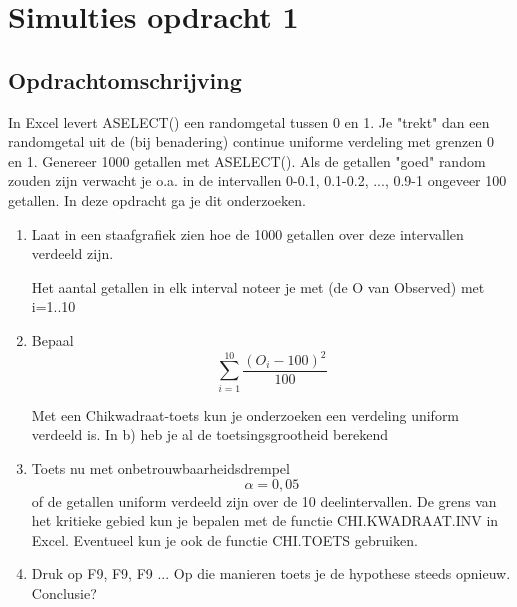 \documentclass{article}
\begin{document}



\section{Simulties opdracht 1}
\label{sec:sample_main}

\subsection{Opdrachtomschrijving}
\label{subsec:sample_opdrom}

In Excel levert ASELECT() een randomgetal tussen 0 en 1. Je "trekt" dan een randomgetal uit de (bij benadering) continue uniforme verdeling met grenzen 0 en 1. Genereer 1000 getallen met ASELECT(). Als de getallen "goed" random zouden zijn verwacht je o.a. in de intervallen 
0-0.1, 0.1-0.2, ..., 0.9-1 ongeveer 100 getallen. In deze opdracht ga je dit onderzoeken.
\newline

\begin{enumerate}[label=(\Alph*)]

\item Laat in een staafgrafiek zien hoe de 1000 getallen over deze intervallen verdeeld zijn. 
\newline

Het aantal getallen in elk interval noteer je met  (de O van Observed) met  i=1..10
\newline

\item Bepaal  \begin{equation} \sum_{i=1}^{10} \frac{(O_i-100)^2}{100} \end{equation}
\newline

Met een Chikwadraat-toets kun je onderzoeken een verdeling uniform verdeeld is. In b) heb je al de toetsingsgrootheid berekend
\newline

\item Toets nu met onbetrouwbaarheidsdrempel \begin{equation} \alpha = 0,05 \end{equation}  of de getallen uniform verdeeld zijn over de 10 deelintervallen. De grens van het kritieke gebied kun je bepalen met de functie CHI.KWADRAAT.INV in Excel. Eventueel kun je ook de functie CHI.TOETS gebruiken.
\newline

\item Druk op F9, F9, F9 ... Op die manieren toets je de hypothese steeds opnieuw. Conclusie?
\end{enumerate}
\end{document}
